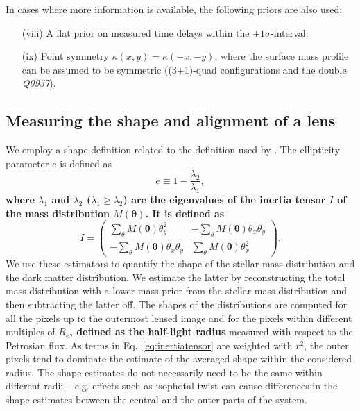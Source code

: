\documentclass[useAMS,usenatbib]{mn2e}
\newcommand{\cb}[1]{{\color{red} \textbf{#1}}}
\begin{document}
In cases where more information is available, the following priors are also used:

\begin{enumerate}
\item[(viii)] A flat prior on measured time delays within the $\pm 1\sigma$-interval.
\item[(ix)] Point symmetry $\kappa(x,y) = \kappa(-x,-y)$, where the surface mass profile can be assumed to be symmetric ((3+1)-quad configurations and the double \textit{Q0957}).

\end{enumerate}

\subsection{Measuring the shape and alignment of a lens}\label{sec:shapemethod}
We employ a shape definition related to the definition used by \cite{2014arXiv1401.7990C}. The ellipticity parameter $e$ is defined as
\begin{equation}\label{eq:shapeestimate}
    e \equiv 1 - \frac{\lambda_{2}}{\lambda_{1}},
\end{equation}
\cb{where $\lambda_{1}$ and $\lambda_{2}$ ($\lambda_{1} \geq \lambda_{2}$) are the eigenvalues of the inertia tensor $I$ of the mass distribution $M(\boldsymbol{\theta})$. It is defined as}
\begin{equation}\label{eq:inertiatensor}
    I = \begin{pmatrix} \sum_\theta M(\boldsymbol{\theta})\theta^{2}_{y} & -\sum_\theta M(\boldsymbol{\theta})\theta_{x}\theta_{y} \\
                        -\sum_\theta M(\boldsymbol{\theta})\theta_{x}\theta_{y} & \sum_\theta M(\boldsymbol{\theta})\theta^{2}_{x} \end{pmatrix}.
\end{equation}
We use these estimators to quantify the shape of the stellar mass distribution and the dark matter distribution. We estimate the latter by reconstructing the total mass distribution with a lower mass prior from the stellar mass distribution and then subtracting the latter off. The shapes of the distributions are computed for all the pixels up to the outermost lensed image and for the pixels within different multiples of \cb{$R_e$, defined as the half-light radius} measured with respect to the Petrosian flux. As terms in Eq.~\ref{eq:inertiatensor} are weighted with $r^2$, the outer pixels tend to dominate the estimate of the averaged shape within the considered radius. The shape estimates do not necessarily need to be the same within different radii -- e.g. effects such as isophotal twist \citep[e.g.][and references therein]{1978ComAp...8...27B} can cause differences in the shape estimates between the central and the outer parts of the system.
\end{document}
